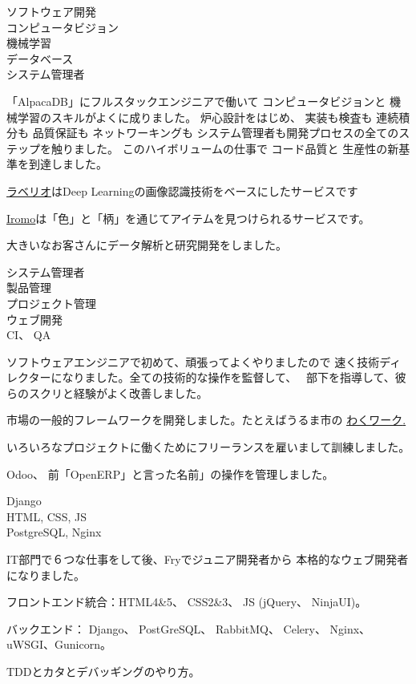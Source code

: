 \documentclass[a4paper,11pt]{cv4tw}%
\begin{document}
{ソフトウェア開発\\コンピュータビジョン\\ 機械学習\\データベース\\システム管理者}
    {
      「AlpacaDB」にフルスタックエンジニアで働いて コンピュータビジョンと
       機械学習のスキルがよくに成りました。
       炉心設計をはじめ、 実装も検査も 連続積分も 品質保証も ネットワーキングも
       システム管理者も開発プロセスの全てのステップを触りました。
       このハイボリュームの仕事で コード品質と 生産性の新基準を到達しました。
	\begin{missions}
        \item \underline{\href{http://www.labell.io/}{ラベリオ}}はDeep
            Learningの画像認識技術をベースにしたサービスです
        \item \underline{\href{http://iromo.jp}{Iromo}}は「色」と「柄」を通じてアイテムを見つけられるサービスです。
        \item 大きいなお客さんにデータ解析と研究開発をしました。
	\end{missions}
}
{システム管理者\\製品管理\\プロジェクト管理\\ウェブ開発\\CI、 QA}
	{ ソフトウェアエンジニアで初めて、頑張ってよくやりましたので
        速く技術ディレクターになりました。全ての技術的な操作を監督して、　
        部下を指導して、彼らのスクリと経験がよく改善しました。
	\begin{missions}
        \item 市場の一般的フレームワークを開発しました。たとえばうるま市の
            \underline{\href{https://uruma-work.com}{わくワーク}.}
        \item いろいろなプロジェクトに働くためにフリーランスを雇いまして訓練しました。
        \item Odoo、 前「OpenERP」と言った名前」の操作を管理しました。
	\end{missions}
}

{Django\\HTML, CSS, JS\\PostgreSQL, Nginx}
	{ IT部門で６つな仕事をして後、Fryでジュニア開発者から 
      本格的なウェブ開発者になりました。
	\begin{missions}
    \item フロントエンド統合：HTML4\&5、 CSS2\&3、 JS (jQuery、 NinjaUI)。
    \item バックエンド： Django、 PostGreSQL、 RabbitMQ、 Celery、 Nginx、
        uWSGI、Gunicorn。
    \item TDDとカタとデバッギングのやり方。
	\end{missions}
}
\end{document}
